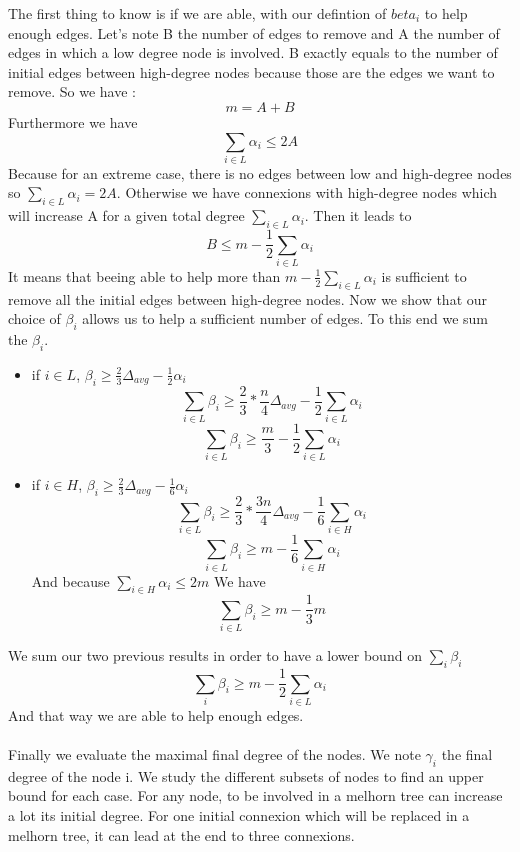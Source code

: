 \documentclass{article}
\begin{document}
The first thing to know is if we are able, with our defintion of $beta_i$
to help enough edges. Let's note B the number of edges to remove and
A the number of edges in which a low degree node is involved.
B exactly equals to the number of initial edges between high-degree
nodes because those are the edges we want to remove. So we have :
$$m = A + B$$
Furthermore we have
$$\sum_{i \in L}\alpha_i \leq 2A$$
Because for an extreme case, there is no edges between low
and high-degree nodes so $\sum_{i \in L}\alpha_i = 2A$.
Otherwise we have connexions with high-degree nodes which will
increase A for a given total degree $\sum_{i \in L}\alpha_i$.
Then it leads to
$$B \leq m - \frac{1}{2}\sum_{i \in L}\alpha_i$$
It means that beeing able to help more than $m - \frac{1}{2}\sum_{i \in L}\alpha_i$
is sufficient to remove all the initial edges between high-degree nodes.
Now we show that our choice of $\beta_i$ allows us to help a sufficient number
of edges. To this end we sum the $\beta_i$.
\begin{itemize}
  \item if $i \in L$,
  $\beta_i \geq \frac{2}{3}\Delta_{avg}-\frac{1}{2}\alpha_i$
  $$\sum_{i \in L}\beta_i \geq \frac{2}{3}*\frac{n}{4}\Delta_{avg} - \frac{1}{2}\sum_{i \in L}\alpha_i$$
  $$\sum_{i \in L}\beta_i \geq \frac{m}{3} - \frac{1}{2}\sum_{i \in L}\alpha_i$$
  \item if $i \in H$,
  $\beta_i \geq \frac{2}{3}\Delta_{avg}-\frac{1}{6}\alpha_i$
  $$\sum_{i \in L}\beta_i \geq \frac{2}{3}*\frac{3n}{4}\Delta_{avg} - \frac{1}{6}\sum_{i \in H}\alpha_i$$
  $$\sum_{i \in L}\beta_i \geq m - \frac{1}{6}\sum_{i \in H}\alpha_i$$
  And because $\sum_{i \in H}\alpha_i \leq 2m$
  We have
  $$\sum_{i \in L}\beta_i \geq m - \frac{1}{3}m$$
\end{itemize}
We sum our two previous results in order to have a lower bound on
$\sum_{i}\beta_i$
$$\sum_{i}\beta_i \geq m - \frac{1}{2}\sum_{i \in L}\alpha_i$$
And that way we are able to help enough edges.\\\\
Finally we evaluate the maximal final degree of the nodes. We note
$\gamma_i$ the final degree of the node i. We study the different
subsets of nodes to find an upper bound for each case. For any node,
to be involved in a melhorn tree can increase a lot its initial degree.
For one initial connexion which will be replaced in a melhorn tree,
it can lead at the end to three connexions.
\end{document}
